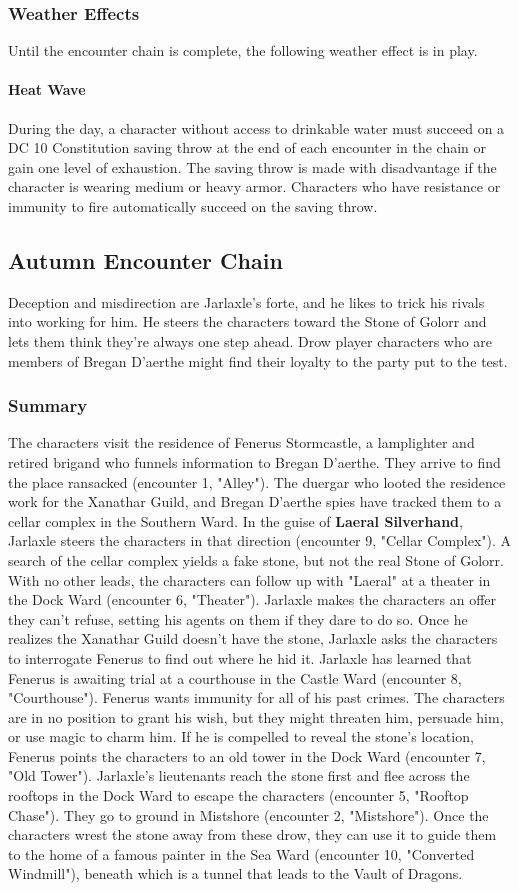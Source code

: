 \documentclass[10pt,a4paper,twoside,twocolumn,openany,nodeprecatedcode]{dndbook}
\begin{document}
\subsubsection{Weather Effects}
Until the encounter chain is complete, the following weather effect is in play.
\paragraph{Heat Wave}
During the day, a character without access to drinkable water must succeed on a DC 10 Constitution saving throw at the end of each encounter in the chain or gain one level of exhaustion. The saving throw is made with disadvantage if the character is wearing medium or heavy armor. Characters who have resistance or immunity to fire automatically succeed on the saving throw.
\subsection{Autumn Encounter Chain}
Deception and misdirection are Jarlaxle's forte, and he likes to trick his rivals into working for him. He steers the characters toward the Stone of Golorr and lets them think they're always one step ahead. Drow player characters who are members of Bregan D'aerthe might find their loyalty to the party put to the test.
\subsubsection{Summary}
The characters visit the residence of Fenerus Stormcastle, a lamplighter and retired brigand who funnels information to Bregan D'aerthe. They arrive to find the place ransacked (encounter 1, "Alley"). The duergar who looted the residence work for the Xanathar Guild, and Bregan D'aerthe spies have tracked them to a cellar complex in the Southern Ward. In the guise of \textbf{Laeral Silverhand}, Jarlaxle steers the characters in that direction (encounter 9, "Cellar Complex"). A search of the cellar complex yields a fake stone, but not the real Stone of Golorr. With no other leads, the characters can follow up with "Laeral" at a theater in the Dock Ward (encounter 6, "Theater"). Jarlaxle makes the characters an offer they can't refuse, setting his agents on them if they dare to do so.
Once he realizes the Xanathar Guild doesn't have the stone, Jarlaxle asks the characters to interrogate Fenerus to find out where he hid it. Jarlaxle has learned that Fenerus is awaiting trial at a courthouse in the Castle Ward (encounter 8, "Courthouse"). Fenerus wants immunity for all of his past crimes. The characters are in no position to grant his wish, but they might threaten him, persuade him, or use magic to charm him. If he is compelled to reveal the stone's location, Fenerus points the characters to an old tower in the Dock Ward (encounter 7, "Old Tower").
Jarlaxle's lieutenants reach the stone first and flee across the rooftops in the Dock Ward to escape the characters (encounter 5, "Rooftop Chase"). They go to ground in Mistshore (encounter 2, "Mistshore"). Once the characters wrest the stone away from these drow, they can use it to guide them to the home of a famous painter in the Sea Ward (encounter 10, "Converted Windmill"), beneath which is a tunnel that leads to the Vault of Dragons.
\end{document}
